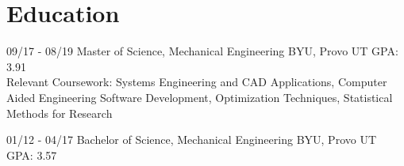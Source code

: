 \documentclass[]{friggeri-cv}
\begin{document}
\section{Education}
\vspace{-3mm}
\begin{entrylist}
    \entry
    {09/17 - 08/19}
    {Master of Science, Mechanical Engineering}
    {BYU, Provo UT}
    {GPA: 3.91\\Relevant Coursework: Systems Engineering and CAD Applications, Computer Aided Engineering Software Development, Optimization Techniques, Statistical Methods for Research}

    \entry
    {01/12 - 04/17}
    {Bachelor of Science, Mechanical Engineering}
    {BYU, Provo UT}
    {GPA: 3.57}



\end{entrylist}

\vspace{-3.5mm}
\end{document}
